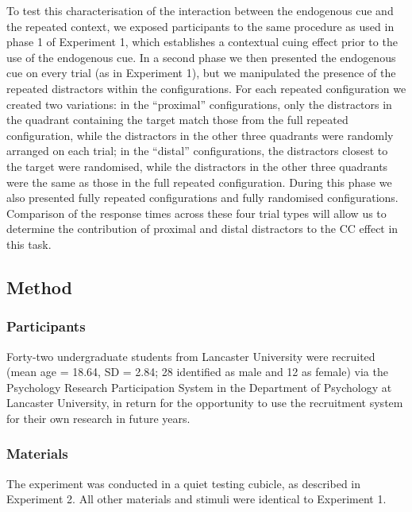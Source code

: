 \documentclass[
  man,floatsintext]{apa7}
\begin{document}
To test this characterisation of the interaction between the endogenous cue and the repeated context, we exposed participants to the same procedure as used in phase 1 of Experiment 1, which establishes a contextual cuing effect prior to the use of the endogenous cue. In a second phase we then presented the endogenous cue on every trial (as in Experiment 1), but we manipulated the presence of the repeated distractors within the configurations. For each repeated configuration we created two variations: in the ``proximal'' configurations, only the distractors in the quadrant containing the target match those from the full repeated configuration, while the distractors in the other three quadrants were randomly arranged on each trial; in the ``distal'' configurations, the distractors closest to the target were randomised, while the distractors in the other three quadrants were the same as those in the full repeated configuration. During this phase we also presented fully repeated configurations and fully randomised configurations. Comparison of the response times across these four trial types will allow us to determine the contribution of proximal and distal distractors to the CC effect in this task.

\hypertarget{method-2}{%
\subsection{Method}\label{method-2}}

\hypertarget{participants-2}{%
\subsubsection{Participants}\label{participants-2}}

Forty-two undergraduate students from Lancaster University were recruited (mean age = 18.64, SD = 2.84; 28 identified as male and 12 as female) via the Psychology Research Participation System in the Department of Psychology at Lancaster University, in return for the opportunity to use the recruitment system for their own research in future years.

\hypertarget{materials-2}{%
\subsubsection{Materials}\label{materials-2}}

The experiment was conducted in a quiet testing cubicle, as described in Experiment 2. All other materials and stimuli were identical to Experiment 1.
\end{document}

